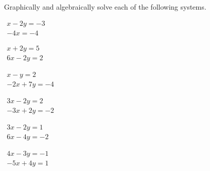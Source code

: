 






\sectionExercises


\begin{exercise}  
Graphically and algebraically solve each of the following systems.

\begin{Parts}
\item\(\begin{array}{l} x-2y=-3\\-4x=-4 \end{array}\)

\begin{reduce}
\item\(\begin{array}{l} x+2y=5\\ 6x -2y=2 \end{array}\)

\item\(\begin{array}{l} x-y=2\\ -2x +7y=-4 \end{array}\)
\end{reduce}

\item\(\begin{array}{l} 3x -2y=2\\ -3x +2y=-2 \end{array}\)

\item\(\begin{array}{l} 3x -2y=1\\ 6x -4y=-2 \end{array}\)

\item\(\begin{array}{l} 4x -3y=-1\\ -5x +4y=1 \end{array}\)


\end{Parts}
\end{exercise}
